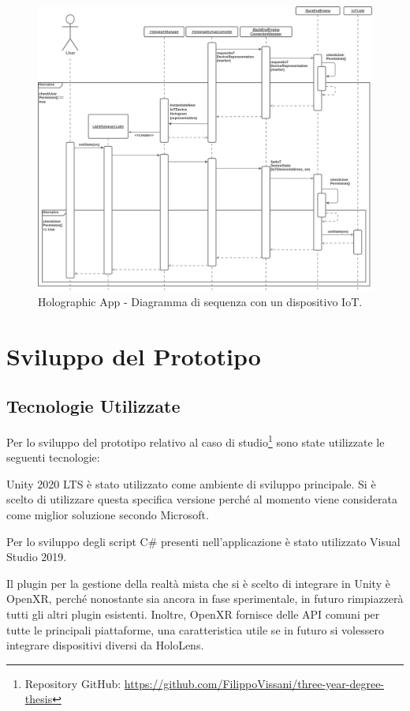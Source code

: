 \begin{figure}[H]
    \centering
    \includegraphics[width=\textwidth]{images/MR Client - Diagramma di Sequenza Dispositivo IoT.jpg}
    \caption{Holographic App - Diagramma di sequenza con un dispositivo IoT.}
    \label{fig:figure47}
\end{figure}

\section{Sviluppo del Prototipo}
\subsection{Tecnologie Utilizzate}
Per lo sviluppo del prototipo relativo al caso di studio\footnote{Repository GitHub: \href{https://github.com/FilippoVissani/three-year-degree-thesis}{https://github.com/FilippoVissani/three-year-degree-thesis}} sono state utilizzate le seguenti tecnologie:

Unity 2020 LTS è stato utilizzato come ambiente di sviluppo principale. Si è scelto di utilizzare questa specifica versione perché al momento viene considerata come miglior soluzione secondo Microsoft.

Per lo sviluppo degli script C\# presenti nell'applicazione è stato utilizzato Visual Studio 2019.

Il plugin per la gestione della realtà mista che si è scelto di integrare in Unity è OpenXR, perché nonostante sia ancora in fase sperimentale, in futuro rimpiazzerà tutti gli altri plugin esistenti.
Inoltre, OpenXR fornisce delle API comuni per tutte le principali piattaforme, una caratteristica utile se in futuro si volessero integrare dispositivi diversi da HoloLens.

